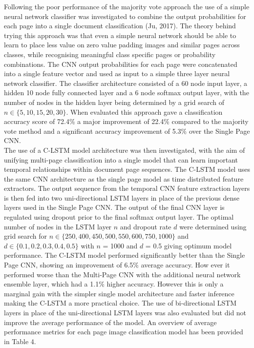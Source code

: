 \documentclass[a4paper,12pt]{article}
\begin{document}
Following the poor performance of the majority vote approach the use of a simple neural network classifier was investigated to combine the output probabilities for each page into a single document classification (Ju, 2017). The theory behind trying this approach was that even a simple neural network should be able to learn to place less value on zero value padding images and similar pages across classes, while recognising meaningful class specific pages or probability combinations. The CNN output probabilities for each page were concatenated into a single feature vector and used as input to a simple three layer neural network classifier. The classifier architecture consisted of a 60 node input layer, a hidden 10 node fully connected layer and a 6 node softmax output layer, with the number of nodes in the hidden layer being determined by a grid search of $n \in \{  5, 10, 15, 20, 30 \}$. When evaluated this approach gave a classification accuracy score of 72.4\% a major improvement of 22.4\% compared to the majority vote method and a significant accuracy improvement of 5.3\% over the Single Page CNN. \\

The use of a C-LSTM model architecture was then investigated, with the aim of unifying multi-page classification into a single model that can learn important temporal relationships within document page sequences. The C-LSTM model uses the same CNN architecture as the single page model as time distributed feature extractors. The output sequence from the temporal CNN feature extraction layers is then fed into two uni-directional LSTM layers in place of the previous dense layers used in the Single Page CNN. The output of the final CNN layer is regulated using dropout prior to the final softmax output layer. The optimal number of nodes in the LSTM layer $n$ and dropout rate $d$ were determined using grid search for $n \in \{250, 400, 450, 500, 550, 600, 750, 1000\}$ and $d \in \{0.1, 0.2, 0.3, 0.4, 0.5\}$  with $n$ = 1000 and $d$ = 0.5 giving optimum model performance. The C-LSTM model performed significantly better than the Single Page CNN, showing an improvement of 6.5\% average accuracy. How ever it performed  worse than the Multi-Page CNN with the additional neural network ensemble layer, which had a 1.1\% higher accuracy. However this is only a marginal gain with the simpler single model architecture and faster inference making the C-LSTM a more practical choice. The use of bi-directional LSTM layers in place of the uni-directional LSTM layers was also evaluated but did not improve the average performance of the model. An overview of average performance metrics for each page image classification model has been provided in Table 4.
\end{document}
